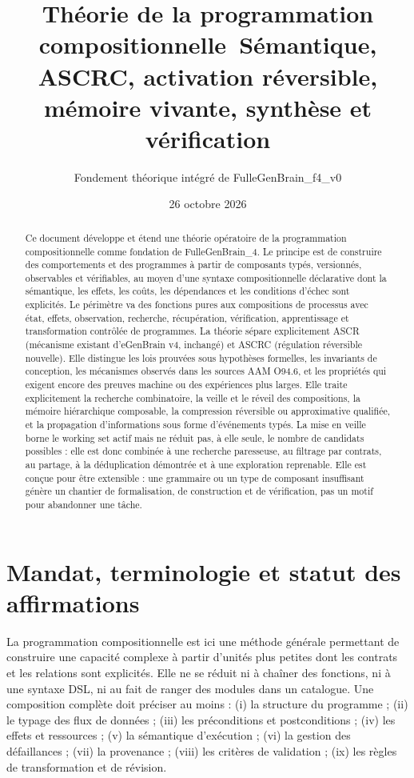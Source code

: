 \documentclass[11pt,a4paper]{article}
\title{Théorie de la programmation compositionnelle\
\large Sémantique, ASCRC, activation réversible, mémoire vivante, synthèse et vérification}
\author{Fondement théorique intégré de FulleGenBrain\_f4\_v0}
\date{26 octobre 2026}
\theoremstyle{definition}
\theoremstyle{plain}
\theoremstyle{remark}
\begin{document}
\maketitle
\begin{abstract}
Ce document développe et étend une théorie opératoire de la programmation compositionnelle comme fondation de FulleGenBrain\_4. Le principe est de construire des comportements et des programmes à partir de composants typés, versionnés, observables et vérifiables, au moyen d'une syntaxe compositionnelle déclarative dont la sémantique, les effets, les coûts, les dépendances et les conditions d'échec sont explicités. Le périmètre va des fonctions pures aux compositions de processus avec état, effets, observation, recherche, récupération, vérification, apprentissage et transformation contrôlée de programmes. La théorie sépare explicitement ASCR (mécanisme existant d’eGenBrain v4, inchangé) et ASCRC (régulation réversible nouvelle). Elle distingue les lois prouvées sous hypothèses formelles, les invariants de conception, les mécanismes observés dans les sources AAM O94.6, et les propriétés qui exigent encore des preuves machine ou des expériences plus larges. Elle traite explicitement la recherche combinatoire, la veille et le réveil des compositions, la mémoire hiérarchique composable, la compression réversible ou approximative qualifiée, et la propagation d'informations sous forme d'événements typés. La mise en veille borne le working set actif mais ne réduit pas, à elle seule, le nombre de candidats possibles : elle est donc combinée à une recherche paresseuse, au filtrage par contrats, au partage, à la déduplication démontrée et à une exploration reprenable. Elle est conçue pour être extensible : une grammaire ou un type de composant insuffisant génère un chantier de formalisation, de construction et de vérification, pas un motif pour abandonner une tâche.
\end{abstract}
\newpage\setcounter{tocdepth}{1}\tableofcontents\newpage

\section{Mandat, terminologie et statut des affirmations}
La programmation compositionnelle est ici une méthode générale permettant de construire une capacité complexe à partir d'unités plus petites dont les contrats et les relations sont explicités. Elle ne se réduit ni à chaîner des fonctions, ni à une syntaxe DSL, ni au fait de ranger des modules dans un catalogue. Une composition complète doit préciser au moins : (i) la structure du programme ; (ii) le typage des flux de données ; (iii) les préconditions et postconditions ; (iv) les effets et ressources ; (v) la sémantique d'exécution ; (vi) la gestion des défaillances ; (vii) la provenance ; (viii) les critères de validation ; (ix) les règles de transformation et de révision.
\end{document}
